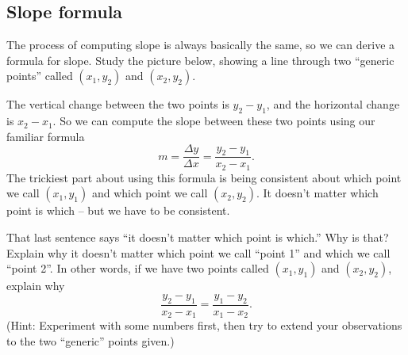\subsection{Slope formula}

The process of computing slope is always basically the same, so we can derive a formula for slope. Study the picture below, showing a line through two ``generic points'' called $(x_1,y_2)$ and $(x_2,y_2)$.

\begin{center}
\end{center}

The vertical change between the two points is $y_2 - y_1$, and the horizontal change is $x_2 - x_1$. So we can compute the slope between these two points using our familiar formula \[m = \frac{\Delta y}{\Delta x} = \frac{y_2 - y_1}{x_2 - x_1}.\] The trickiest part about using this formula is being consistent about which point we call $(x_1, y_1)$ and which point we call $(x_2,y_2)$. It doesn't matter which point is which -- but we have to be consistent.

\begin{boxdef}
That last sentence says ``it doesn't matter which point is which.'' Why is that? Explain why it doesn't matter which point we call ``point 1'' and which we call ``point 2''. In other words, if we have two points called $(x_1, y_1)$ and $(x_2,y_2)$, explain why \[\frac{y_2 - y_1}{x_2 - x_1} = \frac{y_1 - y_2}{x_1 - x_2}.\] (Hint: Experiment with some numbers first, then try to extend your observations to the two ``generic'' points given.)
\end{boxdef}

